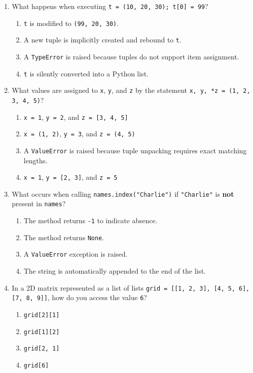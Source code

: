 \documentclass[11pt,a4paper]{article}
\begin{document}
\begin{enumerate}[label=\textbf{Q\arabic*.},leftmargin=2em,itemsep=1.5pt,topsep=1pt,resume]

\item What happens when executing \texttt{t = (10, 20, 30); t[0] = 99}?
\begin{enumerate}[label=\Alph*.,leftmargin=2em]
  \item \texttt{t} is modified to \texttt{(99, 20, 30)}.
  \item A new tuple is implicitly created and rebound to \texttt{t}.
  \item A \texttt{TypeError} is raised because tuples do not support item assignment.
  \item \texttt{t} is silently converted into a Python list.
\end{enumerate}

\item What values are assigned to \texttt{x}, \texttt{y}, and \texttt{z} by the statement \texttt{x, y, *z = (1, 2, 3, 4, 5)}?
\begin{enumerate}[label=\Alph*.,leftmargin=2em]
  \item \texttt{x = 1}, \texttt{y = 2}, and \texttt{z = [3, 4, 5]}
  \item \texttt{x = (1, 2)}, \texttt{y = 3}, and \texttt{z = (4, 5)}
  \item A \texttt{ValueError} is raised because tuple unpacking requires exact matching lengths.
  \item \texttt{x = 1}, \texttt{y = [2, 3]}, and \texttt{z = 5}
\end{enumerate}

\item What occurs when calling \texttt{names.index("Charlie")} if \texttt{"Charlie"} is \textbf{not} present in \texttt{names}?
\begin{enumerate}[label=\Alph*.,leftmargin=2em]
  \item The method returns \texttt{-1} to indicate absence.
  \item The method returns \texttt{None}.
  \item A \texttt{ValueError} exception is raised.
  \item The string is automatically appended to the end of the list.
\end{enumerate}

\item In a 2D matrix represented as a list of lists \texttt{grid = [[1, 2, 3], [4, 5, 6], [7, 8, 9]]}, how do you access the value \texttt{6}?
\begin{enumerate}[label=\Alph*.,leftmargin=2em]
  \item \texttt{grid[2][1]}
  \item \texttt{grid[1][2]}
  \item \texttt{grid[2, 1]}
  \item \texttt{grid[6]}
\end{enumerate}


\end{enumerate}
\end{document}
